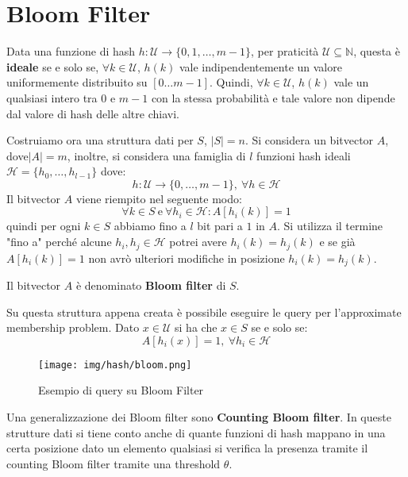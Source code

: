 \section{Bloom Filter}
\begin{definizione} 
    Data una funzione di hash $h : \mathcal{U} \to \{0, 1, \dots, m - 1\}$, per
    praticità $\mathcal{U} \subseteq \mathbb{N}$, questa è \textbf{ideale} se e
    solo se, $\forall k \in \mathcal{U}$, $h(k)$ vale indipendentemente un valore
    uniformemente distribuito su $[0 \dots m - 1]$. Quindi, $\forall k \in
        \mathcal{U}$, $h(k)$ vale un qualsiasi intero tra $0$ e $m - 1$ con la
    stessa probabilità e tale valore non dipende dal valore di hash delle altre
    chiavi.
\end{definizione}
Costruiamo ora una struttura dati per $S$, $|S| = n$. Si considera un bitvector 
$A$, dove$|A| = m$, inoltre, si considera una famiglia di $l$ funzioni hash 
ideali $\mathcal{H} = \{h_0, \dots, h_{l - 1}\}$ dove:
\begin{equation}
    h: \mathcal{U} \to \{0, \dots, m - 1\}, \ \forall h \in \mathcal{H}
\end{equation}
Il bitvector $A$ viene riempito nel seguente modo:
\begin{equation}
    \forall k \in S \ \text{e} \ \forall h_i \in \mathcal{H}: A[h_i(k)] = 1
\end{equation}
quindi per ogni $k \in S$ abbiamo fino a $l$ bit pari a $1$ in $A$. Si utilizza
il termine "fino a" perché alcune $h_i, h_j \in \mathcal{H}$ potrei avere
$h_i(k) = h_j(k)$ e se già $A[h_i(k)] = 1$ non avrò ulteriori modifiche in
posizione $h_i(k) = h_j(k)$.

Il bitvector $A$ è denominato \textbf{Bloom filter} di $S$.

Su questa struttura appena creata è possibile eseguire le query per l'approximate
membership problem. Dato $x \in \mathcal{U}$ si ha che $x \in S$ se e solo se:
\begin{equation}
    A[h_i(x)] = 1, \ \forall h_i \in \mathcal{H}
\end{equation}
\begin{figure}[!ht]
    \centering
    \texttt{[image: img/hash/bloom.png]}
    \caption{Esempio di query su Bloom Filter}
\end{figure}
\newpage
Una generalizzazione dei Bloom filter sono \textbf{Counting Bloom filter}. In
queste strutture dati si tiene conto anche di quante funzioni di hash mappano in
una certa posizione dato un elemento qualsiasi si verifica la presenza tramite
il counting Bloom filter tramite una threshold $\theta$.

